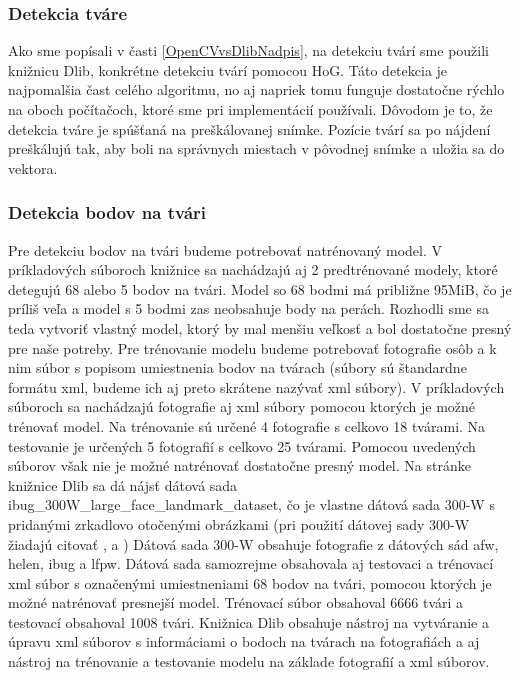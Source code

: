 \subsubsection{Detekcia tváre}\label{detekciaTvare}
Ako sme popísali v časti \ref{OpenCVvsDlibNadpis}, na detekciu tvárí sme použili knižnicu Dlib, konkrétne detekciu tvárí pomocou HoG. 
Táto detekcia je najpomalšia čast celého algoritmu, no aj napriek tomu funguje dostatočne rýchlo na oboch počítačoch, ktoré sme pri implementácií používali.
Dôvodom je to, že detekcia tváre je spúšťaná na preškálovanej snímke.
Pozície tvárí sa po nájdení preškálujú tak, aby boli na správnych miestach v pôvodnej snímke a uložia sa do vektora.

\subsubsection{Detekcia bodov na tvári}\label{detekciaBodov}
Pre detekciu bodov na tvári budeme potrebovať natrénovaný model. 
V príkladových súboroch knižnice sa nachádzajú aj 2 predtrénované modely, ktoré detegujú 68 alebo 5 bodov na tvári. 
Model so 68 bodmi má približne 95MiB, čo je príliš veľa a model s 5 bodmi zas neobsahuje body na perách.
Rozhodli sme sa teda vytvoriť vlastný model, ktorý by mal menšiu veľkosť a bol dostatočne presný pre naše potreby.
Pre trénovanie modelu budeme potrebovať fotografie osôb a k nim súbor s popisom umiestnenia bodov na tvárach (súbory sú štandardne formátu xml, budeme ich aj preto skrátene nazývať xml súbory).
V príkladových súboroch sa nachádzajú fotografie aj xml súbory pomocou ktorých je možné trénovať model.
Na trénovanie sú určené 4 fotografie s celkovo 18 tvárami.
Na testovanie je určených 5 fotografií s celkovo 25 tvárami.
Pomocou uvedených súborov však nie je možné natrénovať dostatočne presný model.
Na stránke knižnice Dlib sa dá nájsť dátová sada ibug\_300W\_large\_face\_landmark\_dataset, čo je vlastne dátová sada 300-W \cite{ibug} s pridanými zrkadlovo otočenými obrázkami (pri použití dátovej sady  300-W \cite{ibug} žiadajú citovať \cite{sagonas2016300}, \cite{sagonas2013300} a \cite{sagonas2013semi}) 
Dátová sada  300-W \cite{ibug} obsahuje fotografie z dátových sád afw, helen, ibug a lfpw. 
Dátová sada samozrejme obsahovala aj testovaci a trénovací xml súbor s označenými umiestneniami 68 bodov na tvári, pomocou ktorých je možné natrénovať presnejší model.
Trénovací súbor obsahoval 6666 tvári a testovací obsahoval 1008 tvári.
Knižnica Dlib obsahuje nástroj na vytváranie a úpravu xml súborov s informáciami o bodoch na tvárach na fotografiách a aj nástroj na trénovanie a testovanie modelu na základe fotografií a xml súborov.
